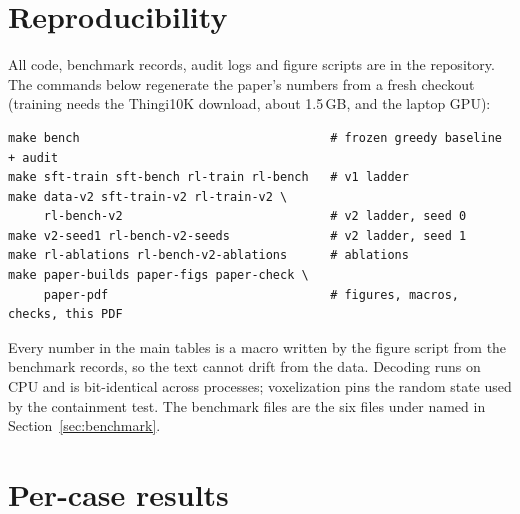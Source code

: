 \section{Reproducibility}
\label{app:repro}
All code, benchmark records, audit logs and figure scripts are in the repository. The commands below regenerate the
paper's numbers from a fresh checkout (training needs the Thingi10K download, about 1.5\,GB, and the laptop GPU):
\begin{verbatim}
make bench                                   # frozen greedy baseline + audit
make sft-train sft-bench rl-train rl-bench   # v1 ladder
make data-v2 sft-train-v2 rl-train-v2 \
     rl-bench-v2                             # v2 ladder, seed 0
make v2-seed1 rl-bench-v2-seeds              # v2 ladder, seed 1
make rl-ablations rl-bench-v2-ablations      # ablations
make paper-builds paper-figs paper-check \
     paper-pdf                               # figures, macros, checks, this PDF
\end{verbatim}
Every number in the main tables is a macro written by the figure script from the benchmark records, so the text
cannot drift from the data. Decoding runs on CPU and is bit-identical across processes; voxelization pins the random
state used by the containment test. The benchmark files are the six \code{.jsonl} files under  named in Section~\ref{sec:benchmark}.

\section{Per-case results}
\label{app:percase}

